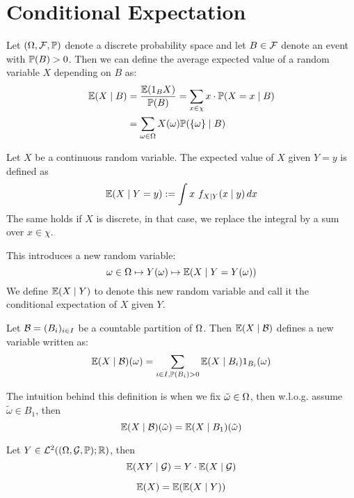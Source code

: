 \section{Conditional Expectation}
\begin{ddefinition*}
  Let \((\O, \F, \P)\) denote a discrete probability space and let \(B \in \F\) denote an event with \(\P(B) > 0\). Then we can define the average expected value of a random variable \(X\) depending on \(B\) as:
  \begin{align*}
    \E(X \mid B) &= \frac{\E(\I_B X)}{\P(B)} = \sum_{x \in \chi} x \cdot \P(X = x \mid B) \\
    &= \sum_{\omega \in \O} X(\omega) \P(\{\omega\} \mid B)
  \end{align*}
\end{ddefinition*}

\begin{cdefinition*}
  Let \(X\) be a continuous random variable. The expected value of \(X\) given \(Y = y\) is defined as
  \[\E(X \mid Y = y) := \int x \ f_{X \mid Y}(x \mid y) \,dx\]
  The same holds if \(X\) is discrete, in that case, we replace the integral by a sum over \(x \in \chi\).
\end{cdefinition*}

This introduces a new random variable:
\[\omega \in \O \mapsto Y(\omega) \mapsto \E(X \mid Y = Y(\omega))\]
We define \(\E(X \mid Y)\) to denote this new random variable and call it the conditional expectation of \(X\) given \(Y\).

\begin{ddefinition*}
  Let \(\B = (B_i)_{i \in I}\) be a countable partition of \(\O\). Then \(\E(X \mid \B)\) defines a new variable written as:
  \[\E(X \mid \B)(\omega) = \sum_{i \in I, \P(B_i) > 0} \E(X \mid B_i) \I_{B_i}(\omega)\]
\end{ddefinition*}

The intuition behind this definition is when we fix \(\tilde{\omega} \in \O\), then w.l.o.g. assume \(\tilde{\omega} \in B_1\), then
\[\E(X \mid \B)(\tilde{\omega}) = \E(X \mid B_1)(\tilde{\omega})\]

\begin{dtheorem*}
  Let \(Y \in \L^2((\O, \mathcal{G}, \P); \R)\), then
  \[\E(XY \mid \mathcal{G}) = Y \cdot \E(X \mid \mathcal{G})\]
\end{dtheorem*}

\begin{theorem*}
  \[\E(X) = \E(\E(X \mid Y))\]
\end{theorem*}
